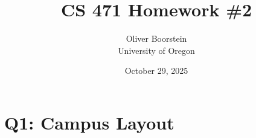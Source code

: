 \documentclass[11pt]{article}
\title{CS 471 Homework \#2}
\author{Oliver Boorstein \\ University of Oregon}
\date{October 29, 2025}
\begin{document}
\maketitle

\section*{Q1: Campus Layout}
\end{document}
